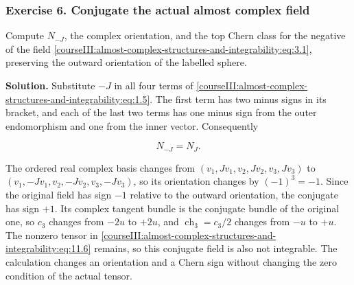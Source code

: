 \subsubsection{Exercise 6. Conjugate the actual almost complex field}
\label{courseIII:almost-complex-structures-and-integrability:exercise-6}

Compute \(N_{-J}\), the complex orientation, and the top Chern class for the negative of the field \eqref{courseIII:almost-complex-structures-and-integrability:eq:3.1}, preserving the outward orientation of the labelled sphere.

\textbf{Solution.} Substitute \(-J\) in all four terms of \eqref{courseIII:almost-complex-structures-and-integrability:eq:1.5}. The first term has two minus signs in its bracket, and each of the last two terms has one minus sign from the outer endomorphism and one from the inner vector. Consequently

\begin{equation}
N_{-J}=N_J.
\label{courseIII:almost-complex-structures-and-integrability:eq:11.6}
\end{equation}

The ordered real complex basis changes from \((v_1,Jv_1,v_2,Jv_2,v_3,Jv_3)\) to \((v_1,-Jv_1,v_2,-Jv_2,v_3,-Jv_3)\), so its orientation changes by \((-1)^3=-1\). Since the original field has sign \(-1\) relative to the outward orientation, the conjugate has sign \(+1\). Its complex tangent bundle is the conjugate bundle of the original one, so \(c_3\) changes from \(-2u\) to \(+2u\), and \(\operatorname{ch}_3=c_3/2\) changes from \(-u\) to \(+u\). The nonzero tensor in \eqref{courseIII:almost-complex-structures-and-integrability:eq:11.6} remains, so this conjugate field is also not integrable. The calculation changes an orientation and a Chern sign without changing the zero condition of the actual tensor.
